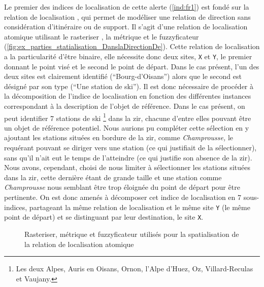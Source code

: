 Le premier des indices de localisation de cette alerte (\ref{ind:fr1})
est fondé sur la relation de localisation
, qui permet de
modéliser une relation de direction sans considération d'itinéraire ou
de support. Il s'agit d'une relation de localisation atomique
utilisant le rasteriser , la métrique
 et le fuzzyficateur 
(\autoref{fig:ex_parties_statialisation_DanslaDirectionDe}). Cette
relation de localisation a la particularité d'être binaire, elle
nécessite donc deux sites, \texttt{X} et \texttt{Y}, le premier
donnant le point visé et le second le point de départ. Dans le cas
présent, l'un des deux sites est clairement identifié
(\enquote{Bourg-d'Oisans}) alors que le second est désigné par son
type (\enquote{Une station de ski}). Il est donc nécessaire de
procéder à la décomposition de l'indice de localisation en fonction
des différentes instances correspondant à la description de l'objet de
référence. Dans le cas présent, on peut identifier 7 stations de ski
\footnote{Les deux Alpes, Auris en Oisans, Ornon, l'Alpe d'Huez, Oz,
  Villard-Reculas et Vaujany.}  dans la \ac{zir}, chacune d'entre
elles pouvant être un objet de référence potentiel. Nous aurions pu
compléter cette sélection en y ajoutant les stations situées en
bordure de la \ac{zir}, comme \emph{Champrousse,} le requérant pouvant
se diriger vers une station (ce qui justifiait de la sélectionner),
sans qu'il n'ait eut le temps de l'atteindre (ce qui justifie son
absence de la \ac{zir}). Nous avons, cependant, choisi de nous limiter
à sélectionner les stations situées dans la \ac{zir}, cette dernière
étant de grande taille et une station comme \emph{Champrousse} nous
semblant être trop éloignée du point de départ pour être pertinente.
On est donc amenés à décomposer cet indice de localisation en 7
sous-indices, partageant la même relation de localisation et le même
site \texttt{Y} (\ie le même point de départ) et se distinguant par
leur destination, le site \texttt{X}.

\begin{figure}
  \centering
  
  \caption{Rasteriser, métrique et fuzzyficateur utilisés pour la
    spatialisation de la relation de localisation atomique
    \protect{}}
  \label{fig:ex_parties_statialisation_DanslaDirectionDe}
\end{figure}

